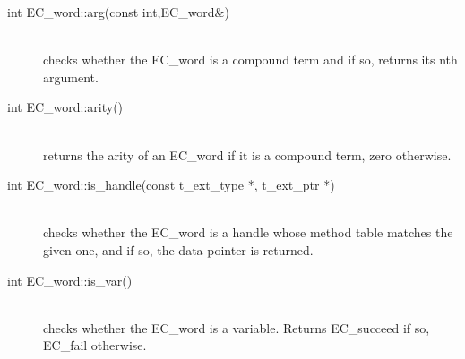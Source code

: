 \begin{description}
\item[int EC_word::arg(const int,EC_word\&)]\ \\
	checks whether the EC_word is a compound term and if so,
	returns its nth argument.

\item[int EC_word::arity()]\ \\
	returns the arity of an EC_word if it is a compound term,
	zero otherwise.

\item[int EC_word::is_handle(const t_ext_type *, t_ext_ptr *)]\ \\
	checks whether the EC_word is a handle whose method table
	matches the given one, and if so, the data pointer is returned.

\item[int EC_word::is_var()]\ \\
	checks whether the EC_word is a variable.
	Returns EC_succeed if so, EC_fail otherwise.
\end{description}


